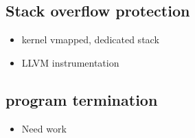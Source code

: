 \subsection{Stack overflow protection}
\begin{itemize}
    \item kernel vmapped, dedicated stack
    \item LLVM instrumentation
\end{itemize}

\subsection{program termination}
\begin{itemize}
    \item Need work
\end{itemize}
